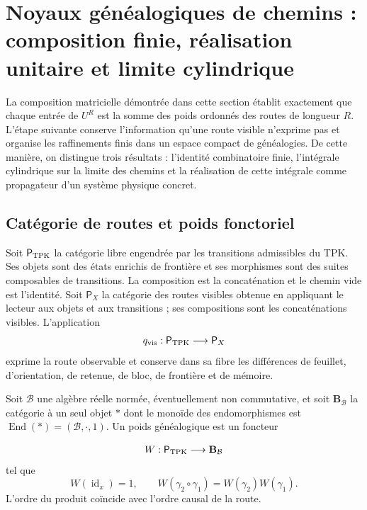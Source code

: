 \section{Noyaux généalogiques de chemins : composition finie, réalisation unitaire et limite cylindrique}
\label{sec:integral-genealogica-caminos-rev2}

La composition matricielle démontrée dans cette section établit exactement que chaque entrée de
\(U^R\) est la somme des poids ordonnés des routes de longueur \(R\).
L’étape suivante conserve l’information qu’une route visible n’exprime pas et
organise les raffinements finis dans un espace compact de généalogies. De
cette manière, on distingue trois résultats : l’identité combinatoire finie,
l’intégrale cylindrique sur la limite des chemins et la réalisation de cette
intégrale comme propagateur d’un système physique concret.

\subsection{Catégorie de routes et poids fonctoriel
}

Soit \(\mathsf P_{\rm TPK}\) la catégorie libre engendrée par les transitions
admissibles du TPK. Ses objets sont des états enrichis de frontière et ses
morphismes sont des suites composables de transitions. La composition est la
concaténation et le chemin vide est l’identité. Soit \(\mathsf P_X\)
la catégorie des routes visibles obtenue en appliquant le lecteur aux
objets et aux transitions ; ses compositions sont les concaténations visibles.
L’application
\[
 q_{\rm vis}:\mathsf P_{\rm TPK}\longrightarrow\mathsf P_X
\]
exprime la route observable et conserve dans sa fibre les différences de feuillet,
d’orientation, de retenue, de bloc, de frontière et de mémoire.

\begin{definition}
\label{def:peso-genealogico-caminos-rev2}
Soit \(\mathcal B\) une algèbre réelle normée, éventuellement non commutative, et
soit \(\mathbf B_{\mathcal B}\) la catégorie à un seul objet \(\ast\) dont le
monoïde des endomorphismes est
\(\operatorname{End}(\ast)=(\mathcal B,\cdot,1)\). Un poids généalogique est un foncteur

\[
 W:\mathsf P_{\rm TPK}\longrightarrow\mathbf B_{\mathcal B}
\]
tel que
\[
 W(\operatorname{id}_x)=1,
 \qquad
 W(\gamma_2\circ\gamma_1)=W(\gamma_2)W(\gamma_1).
\]
L’ordre du produit coïncide avec l’ordre causal de la route.

\end{definition}

